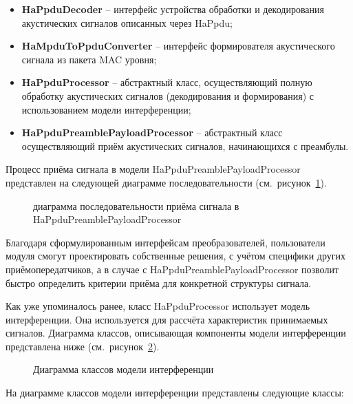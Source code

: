 \documentclass[
    numbers=section,
    document-code={ВКРБ--09.03.04--10.19--XX--26--81}
]{../latex/fqw}
\begin{document}
    \begin{itemize}
        \item \textbf{HaPpduDecoder} --
        интерфейс устройства обработки и декодирования акустических сигналов описанных через HaPpdu;
        \item \textbf{HaMpduToPpduConverter} -- интерфейс формирователя акустического сигнала из пакета MAC уровня;
        \item
        \textbf{HaPpduProcessor} -- абстрактный класс, осуществляющий полную обработку акустических сигналов
        (декодирования и формирования) с использованием модели интерференции;
        \item \textbf{HaPpduPreamblePayloadProcessor} --
        абстрактный класс осуществляющий приём акустических сигналов, начинающихся с преамбулы.
    \end{itemize}

    Процесс приёма сигнала в модели HaPpduPreamblePayloadProcessor представлен на следующей диаграмме последовательности
    (см.~рисунок~\ref{fig:sequence_diagram_of_signal_reception}).

    \begin{figure}[H]
        \centering
        \fbox{\rule{0pt}{20mm}\rule{40mm}{0pt}}
        \caption{диаграмма последовательности приёма сигнала в HaPpduPreamblePayloadProcessor}
        \label{fig:sequence_diagram_of_signal_reception}
    \end{figure}

    Благодаря сформулированным интерфейсам преобразователей,
    пользователи модуля смогут проектировать собственные решения,
    с учётом специфики других приёмопередатчиков,
    а в случае с HaPpduPreamblePayloadProcessor позволит быстро определить критерии приёма
    для конкретной структуры сигнала.

    Как уже упоминалось ранее, класс HaPpduProcessor использует модель интерференции.
    Она используется для рассчёта характеристик принимаемых сигналов.
    Диаграмма классов, описывающая компоненты модели интерференции представлена ниже
    (см.~рисунок~\ref{fig:сlass_diagram_of_interference_model}).

    \begin{figure}[H]
        \centering
        \fbox{\rule{0pt}{20mm}\rule{40mm}{0pt}}
        \caption{Диаграмма классов модели интерференции}
        \label{fig:сlass_diagram_of_interference_model}
    \end{figure}

    На диаграмме классов модели интерференции представлены следующие классы:
\end{document}
